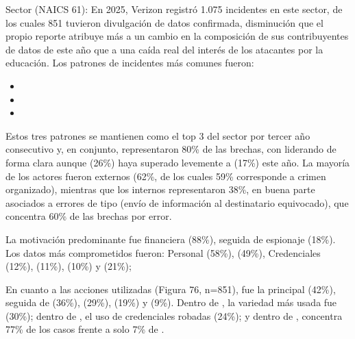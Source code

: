 \begin{respuesta}
  Sector  (NAICS 61):
  En 2025, Verizon registró 1.075 incidentes en este sector, de los cuales 851 tuvieron  divulgación de datos confirmada, disminución que el propio reporte atribuye más a un cambio en la composición de sus contribuyentes de datos de este año que a una caída real del interés de los atacantes por la educación. Los patrones de incidentes más comunes fueron:
  \begin{itemize}
    \item {}
    \item {}
    \item {}
  \end{itemize}
  Estos tres patrones se mantienen como el top 3 del sector por tercer año consecutivo y, en conjunto, representaron 80\% de las brechas, con  liderando de forma clara aunque  (26\%) haya superado levemente a  (17\%) este año. La mayoría de los actores fueron externos (62\%, de los cuales 59\% corresponde a crimen organizado), mientras que los internos representaron 38\%, en buena parte asociados a errores de tipo  (envío de información al destinatario equivocado), que concentra 60\% de las brechas por error.

  La motivación predominante fue financiera (88\%), seguida de espionaje (18\%). Los datos más comprometidos fueron: Personal (58\%),  (49\%), Credenciales (12\%),  (11\%),  (10\%) y  (21\%);


  En cuanto a las acciones utilizadas (Figura 76, n=851),  fue la principal (42\%), seguida de  (36\%),  (29\%),  (19\%) y  (9\%). Dentro de , la variedad más usada fue  (30\%); dentro de , el uso de credenciales robadas (24\%); y dentro de ,  concentra 77\% de los casos frente a solo 7\% de .

\end{respuesta}

